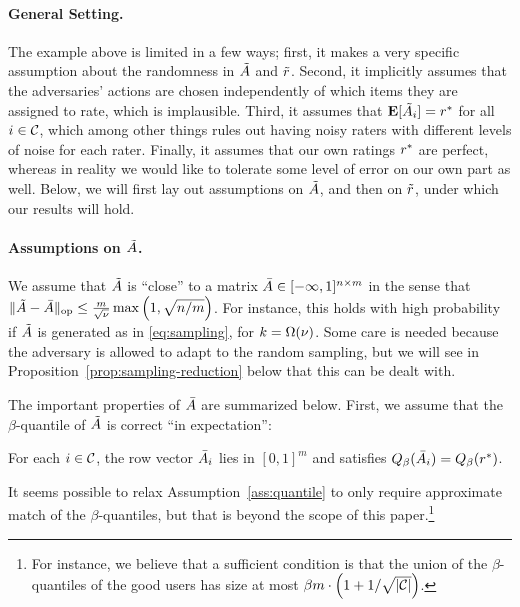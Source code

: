 \paragraph{General Setting.}
The example above is limited in a few ways; first, it makes a very specific 
assumption about the randomness in $\tilde{A}$ and $\tilde{r}$. Second, it implicitly 
assumes that the adversaries' actions are chosen independently of which items 
they are assigned to rate, which is implausible. Third, it assumes that 
$\mathbf{E}[\tilde{A}_i] = r^*$ for all $i \in \mathcal{C}$, which among other things rules out 
having noisy raters with different levels of noise for each rater.
Finally, it assumes that our own ratings $r^*$ are perfect, whereas in reality 
we would like to tolerate some level of error on our own part as well.
Below, we will first lay out assumptions on $\tilde{A}$, and then on $\tilde{r}$, 
under which our results will hold.

\paragraph{Assumptions on $\tilde{A}$.}
We assume that $\tilde{A}$ is ``close'' to a matrix 
$\bar{A} \in [-\infty,1]^{n \times m}$ in the sense that 
$\|\tilde{A} - \bar{A}\|_{\mathrm{op}} \leq \frac{m}{\sqrt{\nu}}\max\left( 1, \sqrt{n/m} \right)$. 
For instance, this holds with high probability if $\tilde{A}$ is generated as in 
\eqref{eq:sampling}, for $k = \Omega(\nu)$. Some care is needed because the 
adversary is allowed to adapt to the random sampling, but we will see in 
Proposition~\ref{prop:sampling-reduction} below that this can be dealt with.

The important properties of $\bar{A}$ are summarized below.
First, we assume that the $\beta$-quantile of $\tilde{A}$ is correct 
``in expectation'':
\begin{assumption}
\label{ass:quantile}
For each $i \in \mathcal{C}$, the row vector $\bar{A}_i$ lies in $[0,1]^m$ and satisfies 
$Q_{\beta}(\bar{A}_i) = Q_{\beta}(r^*)$.
\end{assumption}
It seems possible to relax Assumption~\ref{ass:quantile} to only 
require approximate match of the $\beta$-quantiles, but that is beyond the 
scope of this paper.\footnote{For instance, we believe that 
a sufficient condition is that the union of the $\beta$-quantiles of the good 
users has size at most $\beta m \cdot \left( 1 + 1/\sqrt{|\mathcal{C}|} \right)$.}

